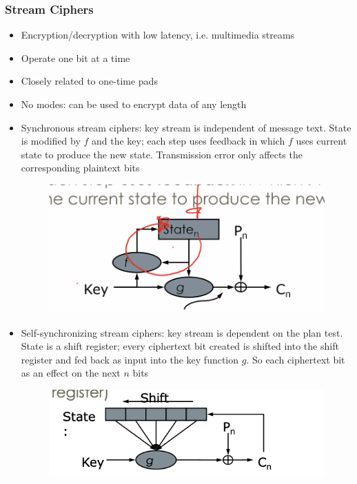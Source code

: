 \documentclass[../notes.tex]{subfiles}
\begin{document}
\subsubsection{Stream Ciphers}

\begin{itemize}
    \item Encryption/decryption with low latency, i.e. multimedia streams
    \item Operate one bit at a time
    \item Closely related to one-time pads
    \item No modes: can be used to encrypt data of any length
    \item Synchronous stream ciphers: key stream is independent of message text. State is modified by $ f $ and the key; each step uses feedback in which $ f $ uses current state to produce the new state. Transmission error only affects the corresponding plaintext bits
        \begin{figure}[H]
            \centering
            \includegraphics[width=0.8\linewidth]{img/image_2023-02-06-18-43-03.png}
        \end{figure}
    \item Self-synchronizing stream ciphers: key stream is dependent on the plan test. State is a shift register; every ciphertext bit created is shifted into the shift register and fed back as input into the key function $ g $. So each ciphertext bit as an effect on the next $ n $ bits
        \begin{figure}[H]
            \centering
            \includegraphics[width=0.8\linewidth]{img/image_2023-02-10-01-39-48.png}

\end{figure}
\end{itemize}
\end{document}
